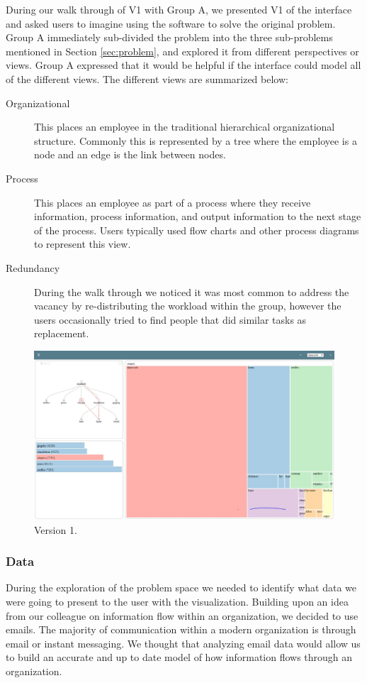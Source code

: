 \documentclass[journal]{vgtc}                %
\begin{document}
During our walk through of V1 with Group A, we presented V1 of the interface and asked users to imagine using the software to solve the original problem. Group A immediately sub-divided the problem into the three sub-problems mentioned in Section \ref{sec:problem}, and explored it from different perspectives or views. Group A expressed that it would be helpful if the interface could model all of the different views. The different views are summarized below:

\begin{description}
\item [Organizational] This places an employee in the traditional hierarchical organizational structure.  Commonly this is represented by a tree where the employee is a node and an edge is the link between nodes.
\item [Process] This places an employee as part of a process where they receive information, process information, and output information to the next stage of the process.  Users typically used flow charts and other process diagrams to represent this view.
\item [Redundancy] During the walk through we noticed it was most common to address the vacancy by re-distributing the workload within the group, however the users occasionally tried to find people that did similar tasks as replacement.
\end{description}
\begin{figure}
  \centering
  \includegraphics[width=\columnwidth]{pictures/version1.JPG}
  \caption{Version 1. }
  \label{fig:version1}
\end{figure}


\subsubsection{Data}
During the exploration of the problem space we needed to identify what data we were going to present to the user with the visualization.  Building upon an idea from our colleague on information flow within an organization, we decided to use emails.  The majority of communication within a modern organization is through email or instant messaging.  We thought that analyzing email data would allow us to build an accurate and up to date model of how information flows through an organization.  
\end{document}
